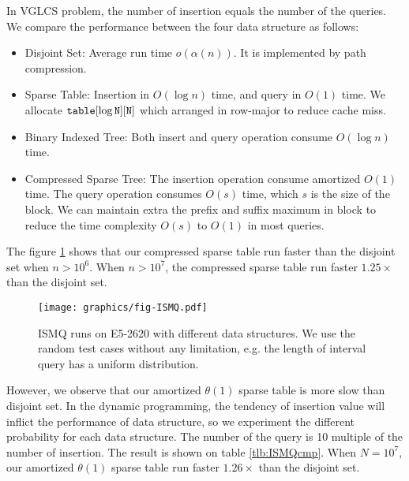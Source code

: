 In VGLCS problem, the number of insertion equals the number of the
queries. We compare the performance between the four data structure as
follows:

\begin{itemize}
  \item 

Disjoint Set: Average run time $o(\alpha(n))$.  It is implemented by
path compression.

  \item 

Sparse Table: Insertion in $O(\log n)$ time, and query in $O(1)$ time.
We allocate $\tt{table}[\log N][N]$ which arranged in row-major to
reduce cache miss.

  \item 

Binary Indexed Tree: Both insert and query operation consume $O(\log
n)$ time.

  \item 

Compressed Sparse Tree: The insertion operation consume amortized
$O(1)$ time.  The query operation consumes $O(s)$ time, which $s$ is
the size of the block.  We can maintain extra the prefix and suffix
maximum in block to reduce the time complexity $O(s)$ to $O(1)$ in
most queries.

\end{itemize}

The figure \ref{fig:fig-ISMQcmp} shows that our compressed sparse
table run faster than the disjoint set when $n > 10^6$.  When $n >
10^7$, the compressed sparse table run faster $1.25 \times$ than the
disjoint set.  

\begin{figure}[!thb]
  \centering
  \texttt{[image: graphics/fig-ISMQ.pdf]}
  \caption{ISMQ runs on E5-2620 with different data structures. We use the random test cases without any limitation, e.g. the length of interval query has a uniform distribution.}
  \label{fig:fig-ISMQcmp}
\end{figure}

However, we observe that our amortized $\theta(1)$ sparse table is
more slow than disjoint set.  In the dynamic programming, the tendency
of insertion value will inflict the performance of data structure, so
we experiment the different probability for each data structure.  The
number of the query is 10 multiple of the number of insertion.  The
result is shown on table \ref{tlb:ISMQcmp}.  When $N=10^7$, our
amortized $\theta(1)$ sparse table run faster $1.26 \times$ than the
disjoint set.

